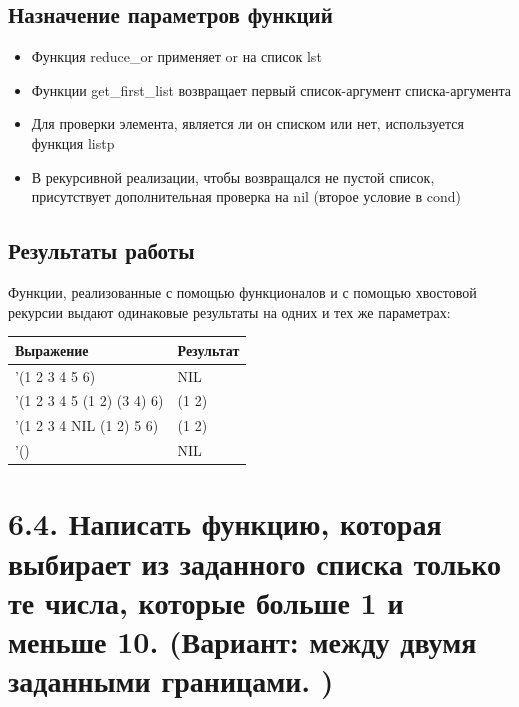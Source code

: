\documentclass[a4paper,12pt]{article}
\begin{document}
 	\newpage
 	
 	\subsection*{Назначение параметров функций}
 	
 	\begin{itemize}
 		\item Функция reduce\_or применяет or на список lst
 		\item Функции get\_first\_list возвращает первый список-аргумент списка-аргумента
 		\item Для проверки элемента, является ли он списком или нет, используется функция listp
 		\item В рекурсивной реализации, чтобы возвращался не пустой список, присутствует дополнительная проверка на nil (второе условие в cond)
 	\end{itemize}
 	
 	\subsection*{Результаты работы}
 	
 	Функции, реализованные с помощью функционалов и с помощью хвостовой рекурсии выдают одинаковые результаты на одних и тех же параметрах:
 	
 	\begin{table} [h!]
 		\begin{center}
 			\begin{tabular}{|l|l|}
 				\hline
 				{\bf  Выражение} & {\bf Результат} \\
 				\hline
 				{'(1 2 3 4 5 6)} & NIL\\
 				\hline
 				{'(1 2 3 4 5 (1 2) (3 4) 6)} & (1 2)\\
 				\hline
 				{'(1 2 3 4 NIL (1 2) 5 6)} & (1 2)\\
 				\hline
 				{'()} & NIL\\
 				\hline
 			\end{tabular}  
 			\label{m2}
 		\end{center}
 	\end{table}
 	
 	
 	\newpage
 	
 	\section*{6.4. Написать функцию, которая выбирает из заданного списка только те числа,
которые больше 1 и меньше 10. (Вариант: между двумя заданными границами. )
 	}
 	
\end{document}
